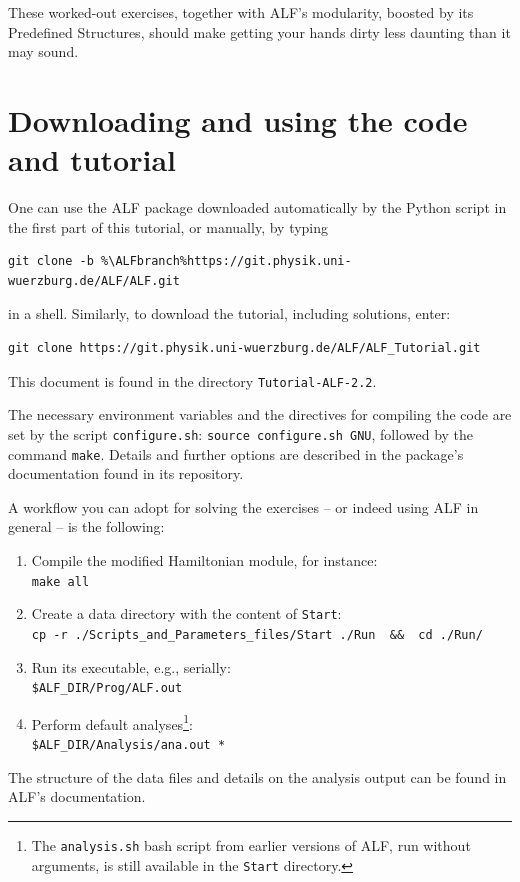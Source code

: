 \documentclass[10pt,modern]{scrartcl}
\numberwithin{exerciseitem}{exercise} %
\newcommand{\ALFver}{2.2}          %
\newcommand{\ALFbranch}{ALF-2.2}   %
\newcommand{\tutALFver}{2.2}       %
\begin{document}
These worked-out exercises, together with ALF's modularity, boosted by its Predefined Structures, should make getting your hands dirty less daunting than it may sound.


\section*{Downloading and using the code and tutorial}
One can use the ALF package downloaded automatically by the Python script in the first part of this tutorial, or manually, by typing
\begin{lstlisting}[style=bash,escapechar=\%]
git clone -b %\ALFbranch%https://git.physik.uni-wuerzburg.de/ALF/ALF.git
\end{lstlisting}
in a shell. Similarly, to download the tutorial, including solutions, enter:
\begin{lstlisting}[style=bash]
git clone https://git.physik.uni-wuerzburg.de/ALF/ALF_Tutorial.git
\end{lstlisting}
This document is found in the directory \texttt{Tutorial-ALF-\tutALFver{}}.

The necessary environment variables and the directives for compiling the code are set by the script \texttt{configure.sh}: \lstinline[style=bash]|source configure.sh GNU|, followed by the command  \lstinline[style=bash,morekeywords={make}]|make|. Details and further options are described in the package's documentation found in its repository.

A workflow you can adopt for solving the exercises -- or indeed using ALF in general -- is the following:
\begin{enumerate}
	\item Compile the modified Hamiltonian module, for instance:\\
	\lstinline[style=bash,morekeywords={make}]{make all}
	\item Create a data directory with the content of \texttt{Start}:\\
	\lstinline[style=bash,morekeywords={cp}]{cp -r ./Scripts_and_Parameters_files/Start ./Run  &&  cd ./Run/}
	\item Run its executable, e.g., serially:\\
	\lstinline[style=bash]{$ALF_DIR/Prog/ALF.out} %
	\item Perform default analyses\footnote{The \texttt{analysis.sh} bash script from earlier versions of ALF, run without arguments, is still available in the \texttt{Start} directory.}:\\
	\lstinline[style=bash]{$ALF_DIR/Analysis/ana.out *} %
\end{enumerate}
The structure of the data files and details on the analysis output can be found in ALF's documentation.
\end{document}
